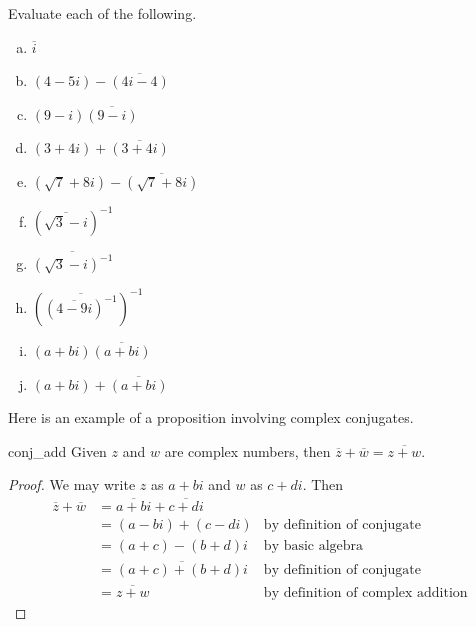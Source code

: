 \begin{exercise}{18}
Evaluate each of the following.
\begin{multicols}{2}
\begin{enumerate}[(a)]
\item
$\overline{i}$
\item
 $(4-5i)-\overline{(4i -4)}$
\item
$(9-i) \overline{(9-i)}$
\item
$(3+4i)+\overline{(3+4i)}$
\item
$(\sqrt{7}+8i)-\overline{(\sqrt{7}+8i)}$
\item 
$\left({\overline{\sqrt{3} -i}}\right)^{-1}$
\item 
$\overline{\left(\sqrt{3} -i\right)^{-1}}$
\item 
$\left( \overline{\left({\overline{4 -9i}}\right)^{-1}} \right) ^{-1}$
\item
$(a + bi)\overline{(a+bi)}$
\item
$(a + bi) + \overline{(a+bi)}$
\end{enumerate}
\end{multicols}
\end{exercise}

Here is an example of a proposition involving complex conjugates.

\begin{prop}{conj_add} Given $z$ and $w$ are complex numbers, then $\overline{z} + \overline{w} = \overline{z + w}$.
\end{prop}
\begin{proof}
We may write $z$ as $a + bi$ and $w$ as $c + di$. Then
\begin{align*}
\overline{z} + \overline{w} &= \overline{a + bi} + \overline{c + di} \\
& = (a - bi) + (c - di) & \textrm{by~definition~of~conjugate}\\
& = (a + c) - (b + d)i & \textrm{by~basic algebra}\\
& = \overline{(a + c) + (b + d)i} & \textrm{by~definition~of~conjugate}\\
& = \overline{z + w} & \textrm{by~definition~of~complex~addition}
\end{align*}
\end{proof}


